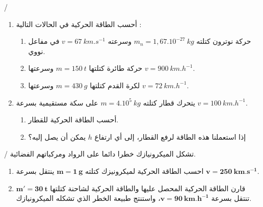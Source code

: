 \documentclass[12pt,a4paper]{article}
\begin{document}
  
					\begin{exercice}{}/
	\begin{enumerate}
	\item 
أحسب الطاقة الحركیة في الحالات التالیة :
	\begin{enumerate}
	\item حركة نوترون كتلته
	$m_n = 1,67.10^{-27}\ kg$
	وسرعته
	$v = 67\ km.s^{-1}$
	في مفاعل نووي.
	\item حركة طائرة كتلتھا
	$m = 150\ t$
	وسرعتھا
$v = 900\ km.h^{-1}$.
\item لكرة القدم كتلتها 
$m = 430\ g$
وسرعتها 
$v=72\ km.h^{-1}$.
\end{enumerate}
\item يتحرك قطار كتلته 
$m=4.10^{5}\ kg$
على سكة مستقيمية بسرعة 
$v = 100\ km.h^{-1}$.
\begin{enumerate}
\item أحسب الطاقة الحركية للقطار.
\item إذا استعملنا هذه الطاقة لرفع القطار، إلى أي ارتفاع 
$h$
يمكن أن يصل إليه؟
\end{enumerate}
\end{enumerate}
	\end{exercice}%
					\begin{exercice}{}/
					تشكل الميكرونيازك خطرا دائما على الرواد ومركباتهم الفضائية.
\begin{enumerate}
\item احسب الطاقة الحركية لميكرونيزك كتلته 
$\bm{m=1\ g}$
ينتقل بسرعة
$\bm{v=250\ km.s^{-1}}$.
\item قارن الطاقة الحركية المحصل عليها والطاقة الحركية 
لشاحنة كتلتها 
$\bm{m'=30\ t}$
تنتقل بسرعة
$\bm{v=90\ km.h^{-1}}$، واستنتج طبيعة الخطر الذي
تشكله الميكرونيازك. 
					\end{enumerate}
					\end{exercice}%
\end{document}

